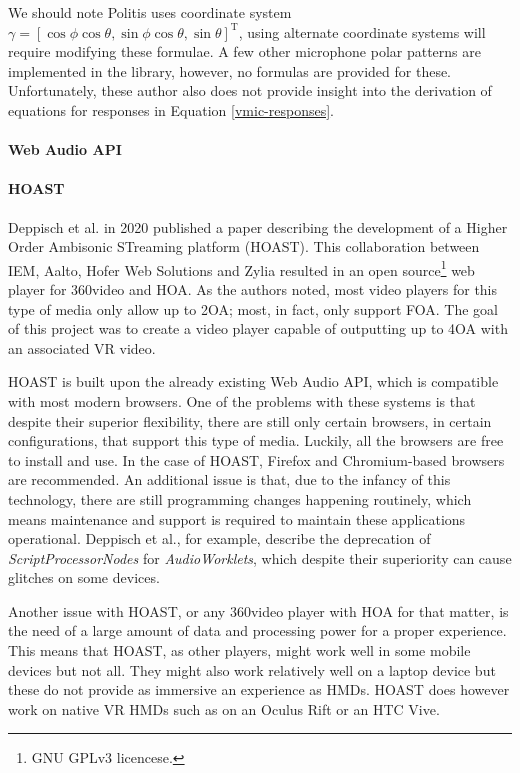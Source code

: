 We should note Politis uses coordinate system $\gamma=[\cos \phi \cos \theta, \sin \phi \cos \theta, \sin \theta]^{\mathrm{T}}$, using alternate coordinate systems will require modifying these formulae. A few other microphone polar patterns are implemented in the library, however, no formulas are provided for these. Unfortunately, these author also does not provide insight into the derivation of equations for responses in Equation \ref{vmic-responses}. 


\paragraph{Web Audio API}

\paragraph{HOAST}

Deppisch et al. \cite{deppisch2020hoast} in 2020 published a paper describing the development of a Higher Order Ambisonic STreaming platform (HOAST). This collaboration between IEM, Aalto, Hofer Web Solutions and Zylia resulted in an open source\footnote{GNU GPLv3 licencese.} web player for 360\textdegree  video and HOA. As the authors noted, most video players for this type of media only allow up to 2OA; most, in fact, only support FOA. The goal of this project was to create a video player capable of outputting up to 4OA with an associated VR video. 

HOAST is built upon the already existing Web Audio API, which is compatible with most modern browsers. One of the problems with these systems is that despite their superior flexibility, there are still only certain browsers, in certain configurations, that support this type of media. Luckily, all the browsers are free to install and use. In the case of HOAST, Firefox and Chromium-based browsers are recommended. An additional issue is that, due to the infancy of this technology, there are still programming changes happening routinely, which means maintenance and support is required to maintain these applications operational. Deppisch et al., for example, describe the deprecation of \textit{ScriptProcessorNodes} for \textit{AudioWorklets}, which despite their superiority can cause glitches on some devices. 

Another issue with HOAST, or any 360\textdegree video player with HOA for that matter, is the need of a large amount of data and processing power for a proper experience. This means that HOAST, as other players, might work well in some mobile devices but not all. They might also work relatively well on a laptop device but these do not provide as immersive an experience as HMDs. HOAST does however work on native VR HMDs such as on an Oculus Rift or an HTC Vive. 

